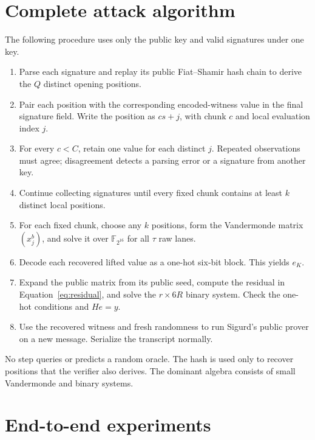 \documentclass[11pt,a4paper]{article}
\newcommand{\F}{\mathbb{F}}
\begin{document}
\section{Complete attack algorithm}

The following procedure uses only the public key and valid signatures under
one key.

\begin{enumerate}[leftmargin=1.8em,label=\textbf{\arabic*.}]
  \item Parse each signature and replay its public Fiat--Shamir hash chain to
        derive the $Q$ distinct opening positions.
  \item Pair each position with the corresponding encoded-witness value in
        the final signature field.  Write the position as $cs+j$, with chunk
        $c$ and local evaluation index $j$.
  \item For every $c<C$, retain one value for each distinct $j$.  Repeated
        observations must agree; disagreement detects a parsing error or a
        signature from another key.
  \item Continue collecting signatures until every fixed chunk contains at
        least $k$ distinct local positions.
  \item For each fixed chunk, choose any $k$ positions, form the Vandermonde
        matrix $(x_j^b)$, and solve it over $\F_{2^{16}}$ for all $\tau$ raw
        lanes.
  \item Decode each recovered lifted value as a one-hot six-bit block.  This
        yields $e_K$.
  \item Expand the public matrix from its public seed, compute the residual in
        Equation~\eqref{eq:residual}, and solve the $r\times 6R$ binary system.
        Check the one-hot conditions and $He=y$.
  \item Use the recovered witness and fresh randomness to run Sigurd's public
        prover on a new message.  Serialize the transcript normally.
\end{enumerate}

No step queries or predicts a random oracle.  The hash is used only to recover
positions that the verifier also derives.  The dominant algebra consists of
small Vandermonde and binary systems.

\section{End-to-end experiments}
\label{sec:experiments}
\end{document}
